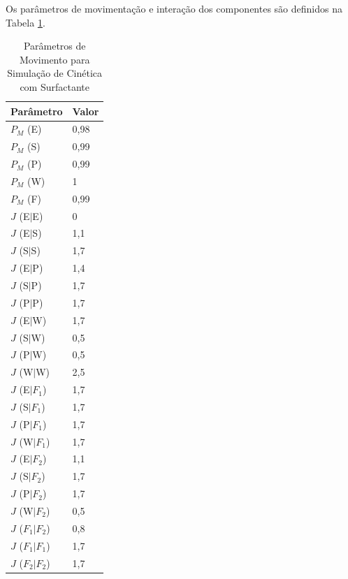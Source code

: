 \documentclass[12pt,oneside]{report}
\begin{document}
Os parâmetros de movimentação e interação dos componentes são definidos na Tabela \ref{tab:params_movimento_surfactante}.

\begin{table}[H]
    \centering
    \caption{Parâmetros de Movimento para Simulação de Cinética com Surfactante}
    \vspace{0.2cm}
    \begin{tabularx}{\textwidth}{X m{5cm}}
        \hline
        \textbf{Parâmetro} & \textbf{Valor} \\
        \hline
        $P_M$ (E)          & 0{,}98         \\
        $P_M$ (S)          & 0{,}99         \\
        $P_M$ (P)          & 0{,}99         \\
        $P_M$ (W)          & 1              \\
        $P_M$ (F)          & 0{,}99         \\
        $J$ (E$|$E)        & 0              \\
        $J$ (E$|$S)        & 1{,}1          \\
        $J$ (S$|$S)        & 1{,}7          \\
        $J$ (E$|$P)        & 1{,}4          \\
        $J$ (S$|$P)        & 1{,}7          \\
        $J$ (P$|$P)        & 1{,}7          \\
        $J$ (E$|$W)        & 1{,}7          \\
        $J$ (S$|$W)        & 0{,}5          \\
        $J$ (P$|$W)        & 0{,}5          \\
        $J$ (W$|$W)        & 2{,}5          \\
        $J$ (E$|F_1$)      & 1{,}7          \\
        $J$ (S$|F_1$)      & 1{,}7          \\
        $J$ (P$|F_1$)      & 1{,}7          \\
        $J$ (W$|F_1$)      & 1{,}7          \\
        $J$ (E$|F_2$)      & 1{,}1          \\
        $J$ (S$|F_2$)      & 1{,}7          \\
        $J$ (P$|F_2$)      & 1{,}7          \\
        $J$ (W$|F_2$)      & 0{,}5          \\
        $J$ ($F_1|F_2$)    & 0{,}8          \\
        $J$ ($F_1|F_1$)    & 1{,}7          \\
        $J$ ($F_2|F_2$)    & 1{,}7          \\
        \hline
    \end{tabularx}
    \vspace{0.2cm}
    \label{tab:params_movimento_surfactante}
\end{table}
\end{document}
